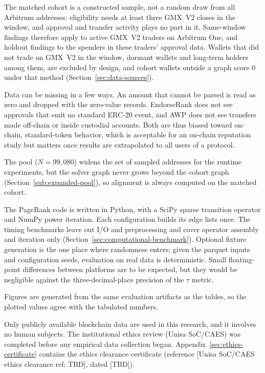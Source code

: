
The matched cohort is a constructed sample, not a random draw from all Arbitrum addresses: eligibility needs at least three GMX~V2 closes in the window, and approval and transfer activity plays no part in it. Same-window findings therefore apply to active GMX~V2 traders on Arbitrum One, and holdout findings to the spenders in these traders' approval data. Wallets that did not trade on GMX~V2 in the window, dormant wallets and long-term holders among them, are excluded by design, and cohort wallets outside a graph score $0$ under that method (Section~\ref{sec:data-sources}).

Data can be missing in a few ways. An amount that cannot be parsed is read as zero and dropped with the zero-value records. EndorseRank does not see approvals that emit no standard ERC-20 event, and AWP does not see transfers made off-chain or inside custodial accounts. Both are thus biased toward on-chain, standard-token behavior, which is acceptable for an on-chain reputation study but matters once results are extrapolated to all users of a protocol.

The pool ($N=99{,}080$) widens the set of sampled addresses for the runtime experiments, but the solver graph never grows beyond the cohort graph (Section~\ref{sub:expanded-pool}), so alignment is always computed on the matched cohort.


The PageRank code is written in Python, with a SciPy sparse transition operator and NumPy power iteration. Each configuration builds its edge lists once. The timing benchmarks leave out I/O and preprocessing and cover operator assembly and iteration only (Section~\ref{sec:computational-benchmark}). Optional fixture generation is the one place where randomness enters; given the parquet inputs and configuration seeds, evaluation on real data is deterministic. Small floating-point differences between platforms are to be expected, but they would be negligible against the three-decimal-place precision of the $\tau$ metric.

Figures are generated from the same evaluation artifacts as the tables, so the plotted values agree with the tabulated numbers.


Only publicly available blockchain data are used in this research, and it involves no human subjects. The institutional ethics review (Unisa SoC/CAES) was completed before any empirical data collection began. Appendix~\ref{sec:ethics-certificate} contains the ethics clearance certificate (reference [Unisa SoC/CAES ethics clearance ref: TBD], dated [TBD]).

